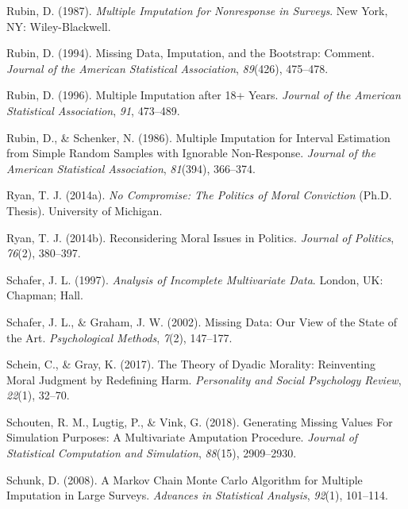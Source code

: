 \documentclass[12pt,econ]{sources/authesis}
\begin{document}
\leavevmode\hypertarget{ref-rubin_1987_multiple}{}%
Rubin, D. (1987). \emph{Multiple Imputation for Nonresponse in Surveys}. New York, NY: Wiley-Blackwell.

\leavevmode\hypertarget{ref-rubin_1994_missing}{}%
Rubin, D. (1994). Missing Data, Imputation, and the Bootstrap: Comment. \emph{Journal of the American Statistical Association}, \emph{89}(426), 475--478.

\leavevmode\hypertarget{ref-rubin_1996_multiple}{}%
Rubin, D. (1996). Multiple Imputation after 18+ Years. \emph{Journal of the American Statistical Association}, \emph{91}, 473--489.

\leavevmode\hypertarget{ref-rubin_1986_multiple}{}%
Rubin, D., \& Schenker, N. (1986). Multiple Imputation for Interval Estimation from Simple Random Samples with Ignorable Non-Response. \emph{Journal of the American Statistical Association}, \emph{81}(394), 366--374.

\leavevmode\hypertarget{ref-ryan_no_2014}{}%
Ryan, T. J. (2014a). \emph{No Compromise: The Politics of Moral Conviction} (Ph.D. Thesis). University of Michigan.

\leavevmode\hypertarget{ref-ryan_reconsidering_2014}{}%
Ryan, T. J. (2014b). Reconsidering Moral Issues in Politics. \emph{Journal of Politics}, \emph{76}(2), 380--397.

\leavevmode\hypertarget{ref-schafer_1997_analysis}{}%
Schafer, J. L. (1997). \emph{Analysis of Incomplete Multivariate Data}. London, UK: Chapman; Hall.

\leavevmode\hypertarget{ref-schafer_2002_missing}{}%
Schafer, J. L., \& Graham, J. W. (2002). Missing Data: Our View of the State of the Art. \emph{Psychological Methods}, \emph{7}(2), 147--177.

\leavevmode\hypertarget{ref-schein_2017_theory}{}%
Schein, C., \& Gray, K. (2017). The Theory of Dyadic Morality: Reinventing Moral Judgment by Redefining Harm. \emph{Personality and Social Psychology Review}, \emph{22}(1), 32--70.

\leavevmode\hypertarget{ref-schouten_2018_generating}{}%
Schouten, R. M., Lugtig, P., \& Vink, G. (2018). Generating Missing Values For Simulation Purposes: A Multivariate Amputation Procedure. \emph{Journal of Statistical Computation and Simulation}, \emph{88}(15), 2909--2930.

\leavevmode\hypertarget{ref-schunk_2008_markov}{}%
Schunk, D. (2008). A Markov Chain Monte Carlo Algorithm for Multiple Imputation in Large Surveys. \emph{Advances in Statistical Analysis}, \emph{92}(1), 101--114.
\end{document}
